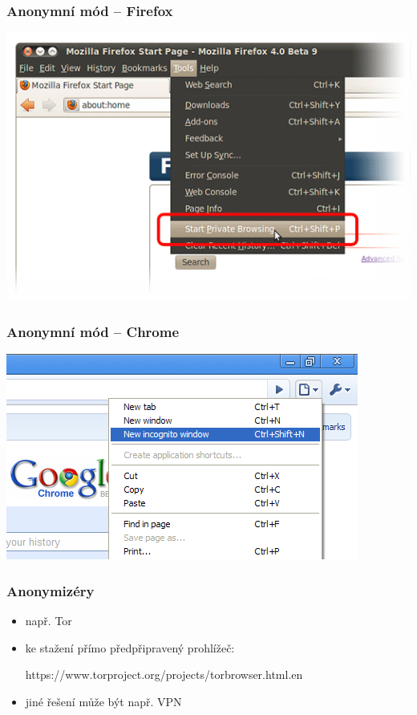 \documentclass[xetex]{beamer}
\begin{document}
\begin{frame}
 	\frametitle{Anonymní mód -- Firefox} 
	\includegraphics[scale=0.5]{pic/firefox-private2.png}
\end{frame}

\begin{frame}
 	\frametitle{Anonymní mód -- Chrome} 
	\includegraphics[scale=0.6]{pic/chromium-private2.png}
\end{frame}

\begin{frame}
	\frametitle{Anonymizéry} 
	\begin{itemize} 
		\item např. Tor
		\item ke stažení přímo předpřipravený prohlížeč:\\
\begin{scriptsize}https://www.torproject.org/projects/torbrowser.html.en\end{scriptsize}
		\item jiné řešení může být např. VPN
	\end{itemize} 
\end{frame}
\end{document}
